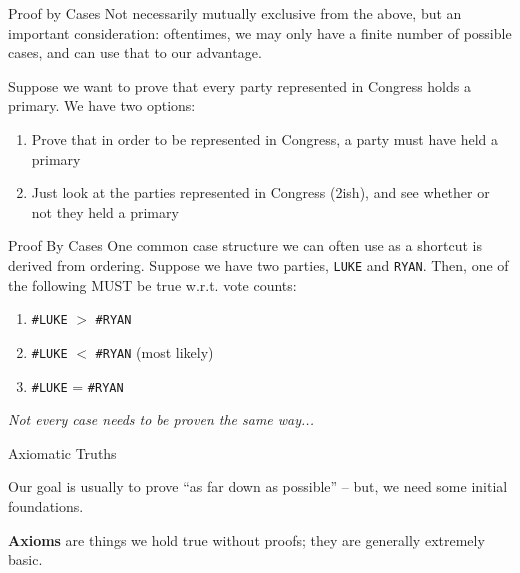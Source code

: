 \documentclass[10pt]{beamer}
\begin{document}
\begin{frame}{Proof by Cases}
Not necessarily mutually exclusive from the above, but an important consideration: oftentimes, we may only have a finite number of possible cases, and can use that to our advantage.

Suppose we want to prove that every party represented in Congress holds a primary. We have two options:

\begin{enumerate}
    \item Prove that in order to be represented in Congress, a party must have held a primary
    \item Just look at the parties represented in Congress (2ish), and see whether or not they held a primary
\end{enumerate}
\end{frame}

\begin{frame}[fragile]{Proof By Cases}
    One common case structure we can often use as a shortcut is derived from ordering. Suppose we have two parties, \verb|LUKE| and \verb|RYAN|. Then, one of the following MUST be true w.r.t. vote counts:
    \begin{enumerate}
        \item \verb|#LUKE| $>$ \verb|#RYAN|
        \item \verb|#LUKE| $<$ \verb|#RYAN| (most likely)
        \item \verb|#LUKE| = \verb|#RYAN|
    \end{enumerate}
    
    \emph{Not every case needs to be proven the same way...}
\end{frame}


\begin{frame}[fragile]{Axiomatic Truths}

    Our goal is usually to prove ``as far down as possible'' -- but, we need some initial foundations.

    \textbf{Axioms} are things we hold true without proofs; they are generally extremely basic.
    
\end{frame}
\end{document}
